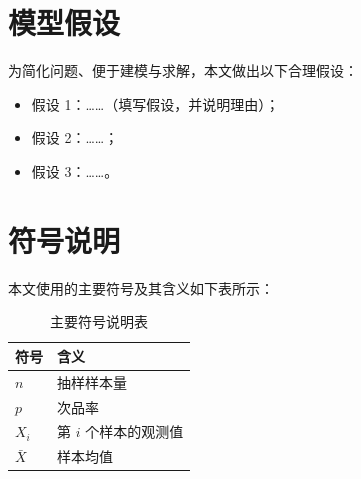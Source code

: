 \section{模型假设}
为简化问题、便于建模与求解，本文做出以下合理假设：

\begin{itemize}
  \item 假设 1：……（填写假设，并说明理由）；
  \item 假设 2：……；
  \item 假设 3：……。
\end{itemize}

\section{符号说明}
本文使用的主要符号及其含义如下表所示：

\begin{table}[htbp]
  \centering
  \caption{主要符号说明表}
  \label{tab:symbols}
  \begin{tabularx}{\textwidth}{@{}>{\centering}p{4cm}>{\centering\arraybackslash}X@{}}
    \toprule
    符号 & 含义 \\
    \midrule
    $n$      & 抽样样本量 \\
    $p$      & 次品率 \\
    $X_i$    & 第 $i$ 个样本的观测值 \\
    $\bar{X}$ & 样本均值 \\
    \bottomrule
  \end{tabularx}
\end{table}
